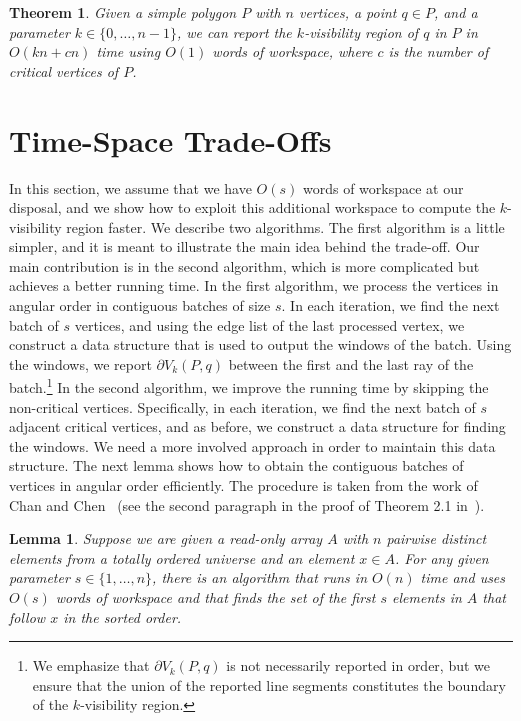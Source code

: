 \documentclass[11pt, a4paper]{article}
\newtheorem{lem}[theorem1]{Lemma}{\bfseries}{\itshape}
\newtheorem{thm}[theorem1]{Theorem}{\bfseries}{\itshape}
\begin{document}
\begin{thm}\label{thm:constant-memory}
Given a simple polygon $P$ with $n$ vertices, a 
point $q\in P$, and a parameter $k \in \{0, \dots, n - 1\}$, 
we can
report the $k$-visibility region of $q$ in $P$ in $O(kn+cn)$ time using $O(1)$ 
words of workspace, where $c$ is the number of critical vertices of $P$.
\end{thm}
\section{Time-Space Trade-Offs}

In this section, we assume that we have $O(s)$ words of workspace 
at our disposal, and we show how to exploit this additional 
workspace to compute the $k$-visibility region faster. We describe 
two algorithms. The first algorithm is a little simpler, and it is meant to 
illustrate the main idea behind the trade-off. Our main contribution 
is in the second algorithm, which is more complicated but achieves 
a better running time. In the first algorithm, we process the 
vertices in angular order in contiguous batches of size $s$. In each 
iteration, we find the next batch of $s$ vertices, and using the 
edge list of the last processed vertex, we construct a data 
structure that is used to output the windows of the batch. Using the 
windows, we report $\partial V_k(P,q)$ between the first and the last 
ray of the batch.\footnote{We emphasize that $\partial V_k(P,q)$
is not necessarily reported in order, but we ensure that the union 
of the reported line segments constitutes the boundary of the
$k$-visibility region.
}
In the second algorithm, we improve the running time by skipping the 
non-critical vertices. Specifically, in each iteration, we find the 
next batch of $s$ adjacent critical vertices, and as before, we 
construct a data structure for finding the windows. We need a more 
involved approach in order to maintain this data structure. 
The next lemma shows how to obtain the contiguous batches of 
vertices in angular order efficiently.  The procedure is taken  
from the work of Chan and Chen~\cite{chan2007multi} (see the second 
paragraph in the proof of Theorem 2.1 in~\cite{chan2007multi}).

\begin{lem}\label{lem:s-smallest}
Suppose we are given a read-only array $A$ with $n$ pairwise distinct 
elements from a totally ordered universe and an element $x \in A$. For 
any given parameter $s \in \{1, \dots, n\}$, there is an 
algorithm that runs in $O(n)$ time and uses $O(s)$ words of workspace 
and that finds the set of the first $s$ elements in $A$ that follow 
$x$ in the sorted order. 
\end{lem}
\end{document}
